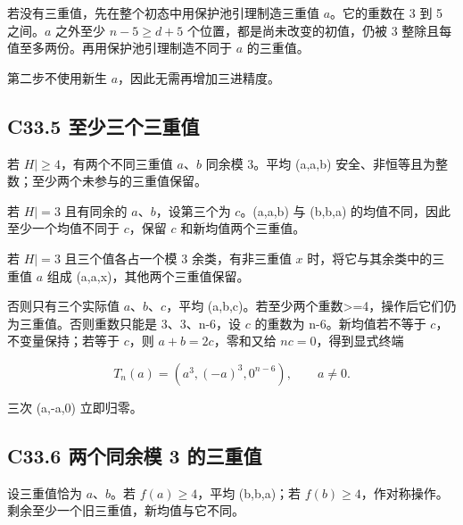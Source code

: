\documentclass[11pt,a4paper]{article}
\theoremstyle{definition}
\numberwithin{equation}{section}
\begin{document}
{若没有三重值，先在整个初态中用保护池引理制造三重值} {\ensuremath{a}。它的重数在} {3} {到} {5} {之间。\ensuremath{a}} {之外至少} {\ensuremath{n-5\ge d+5}} {个位置，都是尚未改变的初值，仍被} {3} {整除且每值至多两份。再用保护池引理制造不同于} {\ensuremath{a}} {的三重值。}

{第二步不使用新生} {\ensuremath{a}，因此无需再增加三进精度。}

\subsection*{\texorpdfstring{{C33.5} {至少三个三重值}}{C33.5 至少三个三重值}}\label{C33-h219}

{若} {\textbar{}\ensuremath{H|\ge 4}，有两个不同三重值} {\ensuremath{a}、\ensuremath{b}} {同余模} {3。平均} {(a,a,b)} {安全、非恒等且为整数；至少两个未参与的三重值保留。}

{若} {\textbar{}\ensuremath{H|=3}} {且有同余的} {\ensuremath{a}、\ensuremath{b}，设第三个为} {\ensuremath{c}。(a,a,b)} {与} {(b,b,a)} {的均值不同，因此至少一个均值不同于} {\ensuremath{c}，保留} {\ensuremath{c}} {和新均值两个三重值。}

{若} {\textbar{}\ensuremath{H|=3}} {且三个值各占一个模} {3} {余类，有非三重值} {\ensuremath{x}} {时，将它与其余类中的三重值} {\ensuremath{a}} {组成} {(a,a,x)，其他两个三重值保留。}

{否则只有三个实际值} {\ensuremath{a}、\ensuremath{b}、\ensuremath{c}，平均} {(a,b,c)。若至少两个重数\textgreater=4，操作后它们仍为三重值。否则重数只能是} {3、3、n-6，设} {\ensuremath{c}} {的重数为} {n-6。新均值若不等于} {\ensuremath{c}，不变量保持；若等于} {\ensuremath{c}，则} {\ensuremath{a+b=2c}，零和又给} {\ensuremath{nc=0}，得到显式终端}

\[
T_n(a)=(a^3,(-a)^3,0^{n-6}),\qquad a\ne0.
\tag{C33.2}
\]

{三次} {(a,-a,0)} {立即归零。}

\subsection*{\texorpdfstring{{C33.6} {两个同余模} {3} {的三重值}}{C33.6 两个同余模 3 的三重值}}\label{C33-h220}

{设三重值恰为} {\ensuremath{a}、\ensuremath{b}。若} {\ensuremath{f(a)\ge 4}，平均} {(b,b,a)；若} {\ensuremath{f(b)\ge 4}，作对称操作。剩余至少一个旧三重值，新均值与它不同。}
\end{document}

